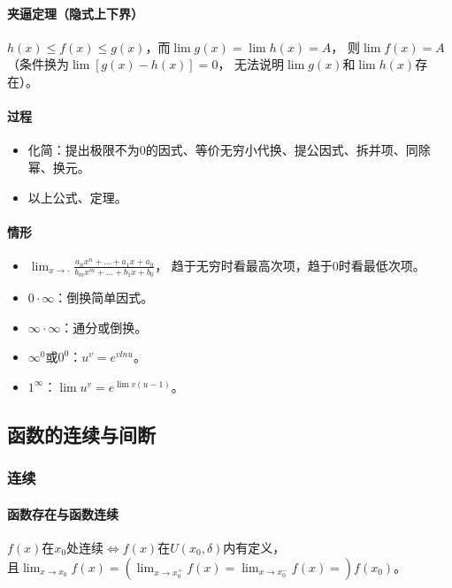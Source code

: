 \documentclass[
12pt, %
a4paper, 
oneside, %
headinclude,footinclude, %
]{scrartcl}
\begin{document}
\paragraph{夹逼定理（隐式上下界）}
$ h(x) \leq f(x) \leq g(x) $，而$ \lim g(x) = \lim h(x) = A $，
则$ \lim f(x) = A $（条件换为$ \lim [g(x) - h(x)] = 0 $，
无法说明$ \lim g(x) $和$ \lim h(x) $存在）。
\paragraph{过程}
\begin{itemize}
\item 化简：提出极限不为$ 0 $的因式、等价无穷小代换、提公因式、拆并项、同除幂、换元。
\item 以上公式、定理。
\end{itemize}
\paragraph{情形}
\begin{itemize}
\item $ \lim_{x \to \cdot} \frac{a_n x^n + \dots + a_1x + a_0}{b_m x^m + \dots + b_1x + b_0} $，
趋于无穷时看最高次项，趋于0时看最低次项。
\item $ 0 \cdot \infty $：倒换简单因式。
\item $ \infty \cdot \infty $：通分或倒换。
\item $ \infty^0 $或$ 0^0 $：$ u^{v} = e^{vlnu} $。
\item $ 1^\infty $：$ \lim u^{v} = e^{\lim v(u - 1)} $。
\end{itemize}
\subsection[函数的连续与间断]{函数的连续与间断}
\subsubsection[连续]{连续}
\paragraph{函数存在与函数连续}
$ f(x) $在$ x_0 $处连续$ \Leftrightarrow $$ f(x) $在$ U(x_0, \delta) $内有定义，\\
且$ \lim_{x \to x_0}f(x) = (\lim_{x \to x_0^+}f(x) = \lim_{x \to x_0^-}f(x) =) f(x_0) $。
\end{document}
